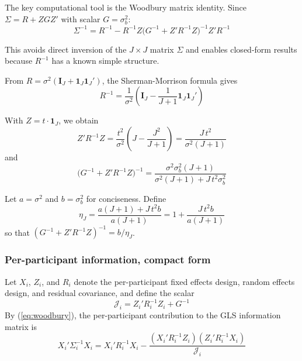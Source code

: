 \documentclass[
  11pt,
]{article}
\begin{document}
The key computational tool is the Woodbury matrix identity.
Since \(\Sigma = R + Z G Z'\) with scalar \(G = \sigma_b^2\):
\begin{equation}
  \Sigma^{-1} = R^{-1} - R^{-1} Z
    \bigl(G^{-1} + Z' R^{-1} Z\bigr)^{-1}
    Z' R^{-1}
  \label{eq:woodbury}
\end{equation}

This avoids direct inversion of the \(J \times J\) matrix
\(\Sigma\) and enables closed-form results because \(R^{-1}\)
has a known simple structure.

From \(R = \sigma^2(\mathbf{I}_J + \mathbf{1}_J
\mathbf{1}_J')\), the Sherman-Morrison formula gives
\begin{equation}
  R^{-1} = \frac{1}{\sigma^2}\left(
    \mathbf{I}_J - \frac{1}{J+1}
    \mathbf{1}_J \mathbf{1}_J'
  \right)
  \label{eq:Rinv}
\end{equation}

With \(Z = t \cdot \mathbf{1}_J\), we obtain
\begin{equation}
  Z' R^{-1} Z = \frac{t^2}{\sigma^2}
    \left(J - \frac{J^2}{J+1}\right)
  = \frac{J\, t^2}{\sigma^2(J+1)}
  \label{eq:ZRZ}
\end{equation}
and
\begin{equation}
  \bigl(G^{-1} + Z' R^{-1} Z\bigr)^{-1}
  = \frac{\sigma^2 \sigma_b^2 (J+1)}
    {\sigma^2(J+1) + J\, t^2 \sigma_b^2}
  \label{eq:H}
\end{equation}

Let \(a = \sigma^2\) and \(b = \sigma_b^2\) for conciseness.
Define
\begin{equation}
  \eta_J = \frac{a(J+1) + J\, t^2 b}{a(J+1)}
  = 1 + \frac{J\, t^2 b}{a(J+1)}
  \label{eq:eta}
\end{equation}
so that \((G^{-1} + Z'R^{-1}Z)^{-1} = b / \eta_J\).

\subsubsection{Per-participant information, compact form}\label{per-participant-information-compact-form}

Let \(X_i\), \(Z_i\), and \(R_i\) denote the per-participant fixed
effects design, random effects design, and residual covariance,
and define the scalar
\begin{equation}
  \mathcal{J}_i
  = Z_i' R_i^{-1} Z_i + G^{-1}
  \label{eq:Ji}
\end{equation}
By (\ref{eq:woodbury}), the per-participant contribution to
the GLS information matrix is
\begin{equation}
  X_i' \Sigma_i^{-1} X_i
  = X_i' R_i^{-1} X_i
    - \frac{(X_i' R_i^{-1} Z_i)(Z_i' R_i^{-1} X_i)}
           {\mathcal{J}_i}
  \label{eq:perpt_info}
\end{equation}
\end{document}
